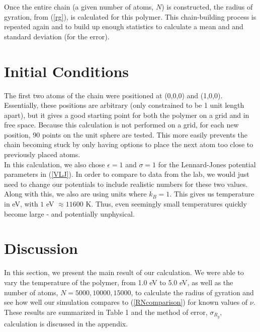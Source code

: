 \documentclass{article}
\begin{document}
\begin{multicols}{2}
Once the entire chain (a given number of atoms, $N$) is constructed, the radius of gyration, from (\ref{rg}), is calculated for this polymer.  This chain-building process is repeated again and to build up enough statistics to calculate a mean and and standard deviation (for the error).  

\section{Initial Conditions}
\label{IC}

The first two atoms of the chain were positioned at (0,0,0) and (1,0,0).  Essentially, these positions are arbitrary (only constrained to be 1 unit length apart), but it gives a good starting point for both the polymer on a grid and in free space.   Because this calculation is not performed on a grid, for each new position, 90 points on the unit sphere are tested.  This more easily prevents the chain becoming stuck by only having options to place the next atom too close to previously placed atoms.  \\

In this calculation, we also chose $\epsilon =1$ and $\sigma=1$ for the Lennard-Jones potential parameters in (\ref{VLJ}).  In order to compare to data from the lab, we would just need to change our potentials to include realistic numbers for these two values.  Along with this, we also are using units where $k_B=1$.  This gives us temperature in eV, with $1$ eV $\approx 11600$ K.  Thus, even seemingly small temperatures quickly become large - and potentially unphysical.\\

\section{Discussion}
\label{discuss}

In this section, we present the main result of our calculation.  We were able to vary the temperature of the polymer, from 1.0 eV to 5.0 eV, as well as the number of atoms, $N=5000, 10000, 15000$, to calculate the radius of gyration and see how well our simulation compares to (\ref{RNcomparison}) for known values of $\nu$.  These results are summarized in Table 1 and the method of error, $\sigma_{R_g}$, calculation is discussed in the appendix.  \\


\end{multicols}
\end{document}
